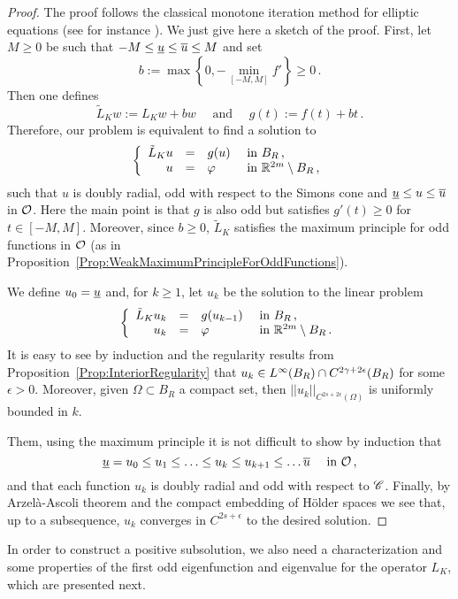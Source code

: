 \begin{proof}
	The proof follows the classical monotone iteration method for elliptic equations (see for instance \cite{Evans}). We just give here a sketch of the proof. 
	First, let $M \geq 0$ be such that $-M \leq \underline{u} \leq \overline{u} \leq M$ and set
	$$
	b := \max \left \{{0, - \min_{[-M,M]}f'}\right \}\geq 0\,.
	$$
	Then one defines 
	$$
	\tilde{L}_K w := L_Kw + b w 	\quad \text{ and } \quad 	g(t) := f(t) + b t\,.
	$$
	Therefore, our problem is equivalent to find a solution to
	$$
	\left\{\begin{array}{rcll}
	\tilde{L}_Ku & = & g(u) & \textrm{ in } B_R\,, \\
	u &=& \varphi &  \textrm{ in } \mathbb{R}^{2m} \setminus B_R\,, 
	\end{array} \right.
	$$
	such that $u$ is doubly radial, odd with respect to the Simons cone and  $\underline{u} \leq u \leq \overline{u}$ in $\mathcal{O}$. Here the main point is that $g$ is also odd but satisfies $g'(t) \geq 0$ for $t \in [-M,M]$. Moreover, since $b \geq 0$, $\tilde{L}_K$ satisfies the maximum principle for odd functions in $\mathcal{O}$ (as in Proposition~\ref{Prop:WeakMaximumPrincipleForOddFunctions}).
	
	We define $u_0 = \underline{u}$ and, for $k\geq 1$, let $u_k$ be the solution to the linear problem
	$$
	\left\{\begin{array}{rcll}
	\tilde{L}_K u_k & = & g(u_{k-1}) & \textrm{ in } B_R\,, \\
	u_k &=& \varphi &  \textrm{ in } \mathbb{R}^{2m} \setminus B_R\,. 
	\end{array} \right.
	$$
	It is easy to see by induction and the regularity results from Proposition~\ref{Prop:InteriorRegularity} that $u_k\in L^\infty(B_R) \cap C^{2\gamma+2\epsilon}(B_R)$ for some $\epsilon>0$. Moreover, given $\Omega\subset B_R$ a compact set, then $||u_k||_{C^{2s+2\epsilon}(\Omega)}$ is uniformly bounded in $k$.
	
	Them, using the maximum principle it is not difficult to show by induction that 
	$$
	\underline{u} = u_0 \leq u_1 \leq \ldots \leq u_k \leq u_{k+1} \leq \ldots \overline{u} \quad \text{ in }\mathcal{O}\,,
	$$
	and that each function $u_k$ is doubly radial and odd with respect to $\mathscr{C}$. Finally, by Arzelà-Ascoli theorem and the compact embedding of H\"older spaces we see that, up to a subsequence, $u_k$ converges in $C^{2s+\epsilon}$ to the desired solution.
\end{proof}

In order to construct a positive subsolution, we also need a characterization and some properties of the first odd eigenfunction and eigenvalue for the operator $L_K$, which are presented next.

